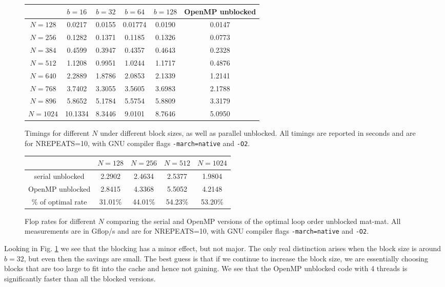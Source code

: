 \documentclass[10pt]{article}
\begin{document}
\begin{enumerate}
\begin{figure}[!ht]
\begin{center}
\begin{tabular}{| c | c | c | c | c | c |}
\hline
& $b=16$ & $b=32$ & $b=64$ & $b=128$ & OpenMP unblocked\\
\hline
$N=128$ & 0.0217 & 0.0155 & 0.01774 & 0.0190 & 0.0147 \\
$N=256$ & 0.1282 &  0.1371 & 0.1185 & 0.1326 & 0.0773 \\
$N=384$ & 0.4599 & 0.3947 & 0.4357 & 0.4643 & 0.2328 \\
$N=512$ & 1.1208 & 0.9951 & 1.0244 & 1.1717 & 0.4876 \\
$N=640$ & 2.2889 & 1.8786 & 2.0853 & 2.1339 & 1.2141 \\
$N=768$ & 3.7402 & 3.3055 & 3.5605  & 3.6983 & 2.1788 \\
$N=896$ & 5.8652 & 5.1784 & 5.5754 & 5.8809 & 3.3179 \\
$N=1024$ & 10.1334 & 8.3446 & 9.0101 & 8.7646 & 5.0950\\
\hline
\end{tabular}
\caption{Timings for different $N$ under different block sizes, as well as parallel unblocked. All timings are reported in seconds and are for NREPEATS=10, with GNU compiler flags \texttt{-march=native} and \texttt{-O2}.} \label{block_timings}
\end{center}
\end{figure}

\begin{figure}[!ht]
\begin{center}
\begin{tabular}{| c | c | c | c | c |}
\hline
& $N=128$ & $N=256 $ & $N=512$ & $N=1024$\\
\hline
serial unblocked  & 2.2902 & 2.4634 & 2.5377 & 1.9804\\
OpenMP unblocked & 2.8415 & 4.3368 & 5.5052 & 4.2148\\
\% of optimal rate & 31.01\% & 44.01\% & 54.23\% & 53.20\% \\
\hline
\end{tabular}
\caption{Flop rates for different $N$ comparing the serial and OpenMP versions of the optimal loop order unblocked mat-mat. All measurements are in Gflop/s and are for NREPEATS=10, with GNU compiler flags \texttt{-march=native} and \texttt{-O2}.} \label{floprate}
\end{center}
\end{figure}

Looking in Fig. \ref{block_timings} we see that the blocking has a minor effect, but not major. The only real distinction arises when the block size is around $b=32$, but even then the savings are small. The best guess is that if we continue to increase the block size, we are essentially choosing blocks that are too large to fit into the cache and hence not gaining. We see that the OpenMP unblocked code with 4 threads is significantly faster than all the blocked versions.




\end{enumerate}
\end{document}
